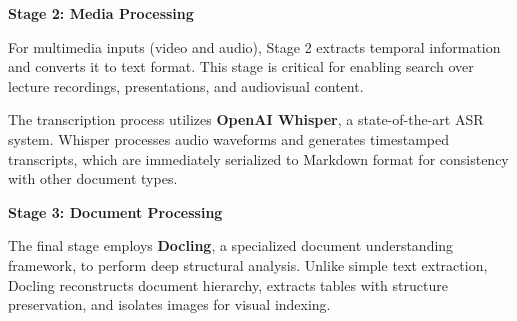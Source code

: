 \textbf{Stage 2: Media Processing}

For multimedia inputs (video and audio), Stage 2 extracts temporal information and converts it to text format. This stage is critical for enabling search over lecture recordings, presentations, and audiovisual content.

\begin{table}[H]
\centering
\caption{Stage 2 media processing transformation mapping.}
\label{tab:media_processing}
\end{table}

The transcription process utilizes \textbf{OpenAI Whisper}, a state-of-the-art ASR system. Whisper processes audio waveforms and generates timestamped transcripts, which are immediately serialized to Markdown format for consistency with other document types.

\textbf{Stage 3: Document Processing}

The final stage employs \textbf{Docling}, a specialized document understanding framework, to perform deep structural analysis. Unlike simple text extraction, Docling reconstructs document hierarchy, extracts tables with structure preservation, and isolates images for visual indexing.

\begin{table}[H]
\centering
\caption{Stage 3 document processing with Docling outputs.}
\label{tab:docling_processing}
\end{table}

